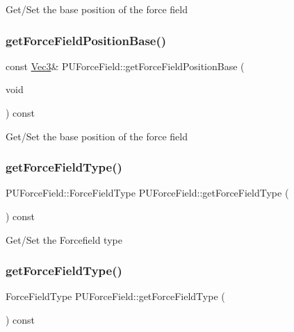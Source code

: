 Get/\+Set the base position of the force field \mbox{\label{classPUForceField_a5d0fa8a04f77a32cf7503dd96ba0938c}} 
\subsubsection{\texorpdfstring{get\+Force\+Field\+Position\+Base()}{getForceFieldPositionBase()}\hspace{0.1cm}{\footnotesize\ttfamily [2/2]}}
{\footnotesize\ttfamily const \hyperlink{classVec3}{Vec3}\& P\+U\+Force\+Field\+::get\+Force\+Field\+Position\+Base (\begin{DoxyParamCaption}\item[{void}]{ }\end{DoxyParamCaption}) const}

Get/\+Set the base position of the force field \mbox{\label{classPUForceField_a3d4c0662978c820f91bf77751210b1e8}} 
\subsubsection{\texorpdfstring{get\+Force\+Field\+Type()}{getForceFieldType()}\hspace{0.1cm}{\footnotesize\ttfamily [1/2]}}
{\footnotesize\ttfamily P\+U\+Force\+Field\+::\+Force\+Field\+Type P\+U\+Force\+Field\+::get\+Force\+Field\+Type (\begin{DoxyParamCaption}{ }\end{DoxyParamCaption}) const}

Get/\+Set the Forcefield type \mbox{\label{classPUForceField_a0768666fc2138a381104b19f3be4e986}} 
\subsubsection{\texorpdfstring{get\+Force\+Field\+Type()}{getForceFieldType()}\hspace{0.1cm}{\footnotesize\ttfamily [2/2]}}
{\footnotesize\ttfamily Force\+Field\+Type P\+U\+Force\+Field\+::get\+Force\+Field\+Type (\begin{DoxyParamCaption}{ }\end{DoxyParamCaption}) const}

